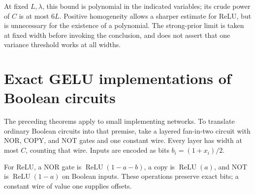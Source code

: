 \documentclass[11pt]{article}
\theoremstyle{remark}\newtheorem{remark}[theorem]{Remark}
\newcommand{\relu}{\operatorname{ReLU}}\newcommand{\gelu}{\operatorname{GELU}}
\begin{document}
At fixed $L,\lambda$, this bound is polynomial in the indicated variables; its crude power of $C$ is at most $6L$. Positive homogeneity allows a sharper estimate for ReLU, but is unnecessary for the existence of a polynomial. The strong-prior limit is taken at fixed width before invoking the conclusion, and does not assert that one variance threshold works at all widths.







\section{Exact GELU implementations of Boolean circuits}\label{sec:gelu}
The preceding theorems apply to small implementing networks. To translate ordinary Boolean circuits into that premise, take a layered fan-in-two circuit with NOR, COPY, and NOT gates and one constant wire. Every layer has width at most $C$, counting that wire. Inputs are encoded as bits $b_i=(1+x_i)/2$.

For ReLU, a NOR gate is $\relu(1-a-b)$, a copy is $\relu(a)$, and NOT is $\relu(1-a)$ on Boolean inputs. These operations preserve exact bits; a constant wire of value one supplies offsets.
\end{document}
